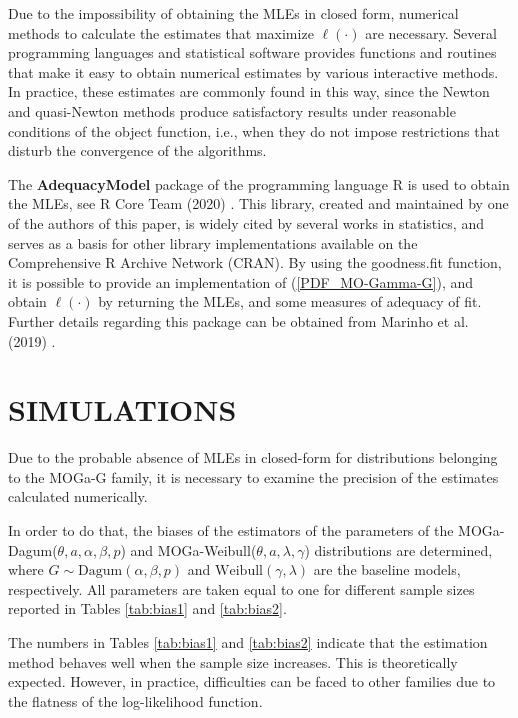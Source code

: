 \documentclass[twoside,leqno,11pt]{article}
\begin{document}
Due to the impossibility of obtaining the MLEs in closed form, numerical methods to calculate the estimates that maximize $\ell(\cdot)$ are necessary. Several programming languages and statistical software provides functions and routines that make it easy to obtain numerical estimates by various interactive methods. In practice, these estimates are commonly found in this way, since the Newton and quasi-Newton methods produce satisfactory results under reasonable conditions of the object function, i.e., when they do not impose restrictions that disturb the convergence of 
the algorithms.

The {\bf AdequacyModel} package of the programming language {\sf R} is used to obtain the MLEs, see R Core Team (2020) \cite{Team}. This library, created and maintained by one of the authors of this paper,
is widely cited by several works in statistics, and serves as 
a basis for other library implementations available on the Comprehensive R Archive Network (CRAN). By using the goodness.fit function, it is possible to provide an implementation  
of (\ref {PDF_MO-Gamma-G}), and obtain $\ell(\cdot)$ by returning the MLEs, and some measures of adequacy of fit. Further details regarding this package can be obtained from Marinho et al. (2019) \cite{Marinho}.


\section{SIMULATIONS}\label{sec:simulation}

Due to the probable absence of MLEs in closed-form for distributions belonging to the MOGa-G family, it is necessary to examine the precision of the estimates calculated numerically. 

In order to do that, the biases of the estimators of the 
parameters of the MOGa-Dagum($\theta,a,\alpha,\beta,p$) and  MOGa-Weibull($\theta,a,\lambda,\gamma$) distributions 
are determined, where $G\sim \mathrm {Dagum} (\alpha,\beta,p)$ and $\mathrm {Weibull} (\gamma,\lambda)$ are the baseline models, respectively. All parameters are taken equal to 
one for different sample sizes reported in Tables \ref{tab:bias1} and \ref{tab:bias2}. 

The numbers in Tables \ref{tab:bias1} and \ref{tab:bias2} 
indicate that the estimation method behaves well when the 
sample size increases. This is theoretically expected. However, 
in practice, difficulties can be faced to other families due 
to the flatness of the log-likelihood function.
\end{document}
